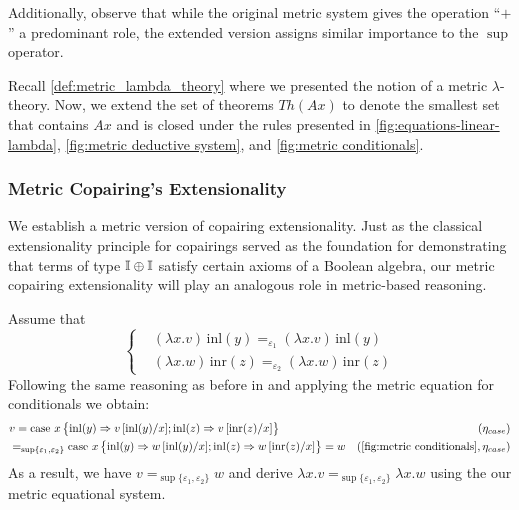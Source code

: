 Additionally, observe that while the original metric system gives the operation ``$+$'' a predominant role, the extended version assigns similar importance to the $\sup$ operator. 


\vspace{5pt}
Recall \autoref{def:metric_lambda_theory} where we presented the notion of a metric $\lambda$-theory. Now, we extend the set of theorems \( Th(Ax) \) to denote the smallest set that contains \( Ax \) and is closed under the rules presented in \autoref{fig:equations-linear-lambda}, \autoref{fig:metric deductive system}, and \autoref{fig:metric conditionals}.




\subsubsection{Metric Copairing's Extensionality}

We establish  a metric version of copairing extensionality. Just as the classical extensionality principle for copairings served as the foundation for demonstrating that terms of type $\mathbb{I} \oplus \mathbb{I}$ satisfy certain axioms of a Boolean algebra, our metric copairing extensionality will play an analogous role in metric-based reasoning.

Assume that 
\[
\left\{
\begin{aligned}
&(\lambda x.v)\, \text{inl}(y) =_{\varepsilon_1} (\lambda x.v)\, \text{inl}(y) \\
&(\lambda x.w)\, \text{inr}(z) =_{\varepsilon_2}(\lambda x.w)\, \text{inr}(z)
\end{aligned}
\right.
\]
Following the same reasoning as before in  and applying the metric equation for conditionals we obtain:
\begin{equation*}
\begin{split}
  &v =  \text{case } x  
    \left\{ \begin{aligned}
    \inl(y) \Rightarrow v\,[\text{inl}(y)/x] ;  
    \inl(z) \Rightarrow v\,[\text{inr}(z)/x]
  \end{aligned}  \right\} & (\eta_{case})\\
  &=_{\sup \{\varepsilon_1,\varepsilon_2\}} \text{case } x  
    \left\{ \begin{aligned}
    \inl(y) \Rightarrow w\,[\text{inl}(y)/x] ;  
    \inl(z) \Rightarrow w\,[\text{inr}(z)/x]
  \end{aligned}  \right\} = w & (\text{\autoref{fig:metric conditionals}},\eta_{case})
\end{split}
\end{equation*}
As a result, we have $v =_{\sup \{\varepsilon_1,\varepsilon_2\}} w$ and derive $\lambda x.v =_{\sup \{\varepsilon_1,\varepsilon_2\}} \lambda x.w$ using the our metric equational system.

